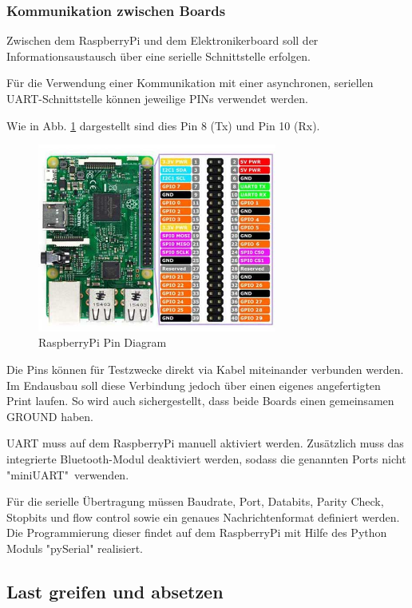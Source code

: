 \documentclass[a4paper]{report}
\begin{document}
\newpage

\subsubsection{Kommunikation zwischen Boards}
\label{ssec:kommunikation}
Zwischen dem RaspberryPi und dem Elektronikerboard soll der Informationsaustausch über eine serielle Schnittstelle erfolgen.

Für die Verwendung einer Kommunikation mit einer asynchronen, seriellen UART-Schnittstelle können jeweilige PINs verwendet werden.

Wie in Abb. \ref{fig:RaspberryPins} dargestellt sind dies Pin 8 (Tx) und Pin 10 (Rx).
\begin{figure}[h!]
	\centering
	\includegraphics[keepaspectratio, width=0.7\textwidth]{raspberry_pi3_model_b_pin_diagram.jpg}
	\caption{RaspberryPi Pin Diagram}
	\label{fig:RaspberryPins}
\end{figure}

Die Pins können für Testzwecke direkt via Kabel miteinander verbunden werden. Im Endausbau soll diese Verbindung jedoch über einen eigenes angefertigten Print laufen. So wird auch sichergestellt, dass beide Boards einen gemeinsamen GROUND haben.

UART muss auf dem RaspberryPi manuell aktiviert werden.  Zusätzlich muss das integrierte Bluetooth-Modul deaktiviert werden, sodass die genannten Ports nicht "miniUART"\ verwenden.

Für die serielle Übertragung müssen Baudrate, Port, Databits, Parity Check, Stopbits und flow control sowie ein genaues Nachrichtenformat definiert werden. Die Programmierung dieser findet auf dem RaspberryPi mit Hilfe des Python Moduls "pySerial" realisiert.

\newpage

\subsection{Last greifen und absetzen}
\end{document}
